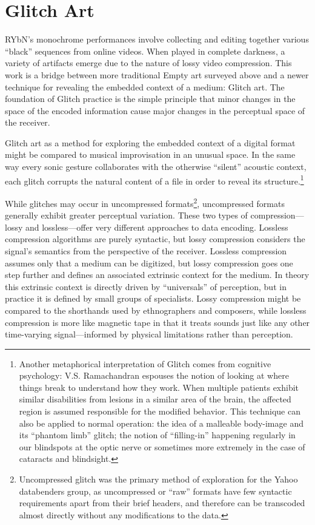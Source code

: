 \documentclass{thesis}
\begin{document}
\section{Glitch Art}

RYbN's monochrome performances\cite{rybn_monochrome_2008} involve collecting and editing together various ``black'' sequences from online videos. When played in complete darkness, a variety of artifacts emerge due to the nature of lossy video compression. This work is a bridge between more traditional Empty art surveyed above and a newer technique for revealing the embedded context of a medium: Glitch art. The foundation of Glitch practice is the simple principle that minor changes in the space of the encoded information cause major changes in the perceptual space of the receiver.

Glitch art as a method for exploring the embedded context of a digital format might be compared to musical improvisation in an unusual space. In the same way every sonic gesture collaborates with the otherwise ``silent'' acoustic context, each glitch corrupts the natural content of a file in order to reveal its structure.\footnote{Another metaphorical interpretation of Glitch comes from cognitive psychology: V.S. Ramachandran espouses the notion of looking at where things break to understand how they work\cite{ramachandran_phantoms_1999}. When multiple patients exhibit similar disabilities from lesions in a similar area of the brain, the affected region is assumed responsible for the modified behavior. This technique can also be applied to normal operation: the idea of a malleable body-image and its ``phantom limb'' glitch; the notion of ``filling-in'' happening regularly in our blindspots at the optic nerve or sometimes more extremely in the case of cataracts and blindsight.}

While glitches may occur in uncompressed formats\footnote{Uncompressed glitch was the primary method of exploration for the Yahoo databenders group\cite{indianropeburn_databenders_????}, as uncompressed or ``raw'' formats have few syntactic requirements apart from their brief headers, and therefore can be transcoded almost directly without any modifications to the data.}, uncompressed formats generally exhibit greater perceptual variation. These two types of compression---lossy and lossless---offer very different approaches to data encoding. Lossless compression algorithms are purely syntactic, but lossy compression considers the signal's semantics from the perspective of the receiver. Lossless compression assumes only that a medium can be digitized, but lossy compression goes one step further and defines an associated extrinsic context for the medium. In theory this extrinsic context is directly driven by ``universals'' of perception, but in practice it is defined by small groups of specialists. Lossy compression might be compared to the shorthands used by ethnographers\cite{myers_ethnomusicology:introduction_1992} and composers, while lossless compression is more like magnetic tape in that it treats sounds just like any other time-varying signal---informed by physical limitations rather than perception.
\end{document}
